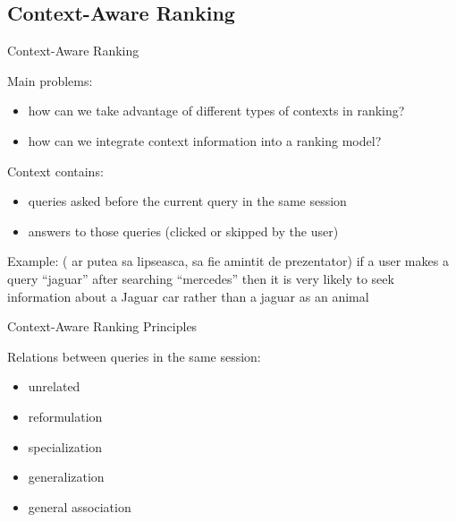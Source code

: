 \subsection{Context-Aware Ranking}


\begin{frame}{Context-Aware Ranking}

Main problems:
\begin{itemize}
	\item how can we take advantage of different types of contexts in ranking?
	\item how can we integrate context information into a ranking model? \newline
\end{itemize}

Context contains:
\begin{itemize}
	\item queries asked before the current query in the same session
	\item answers to those queries (clicked or skipped by the user) \newline
\end{itemize}

Example: ({\color{red} ar putea sa lipseasca, sa fie amintit de prezentator}) \newline
	if a user makes a query “jaguar” after searching “mercedes” then it is very likely to seek information about a Jaguar car rather than a jaguar as an animal

\end{frame}


\begin{frame}{Context-Aware Ranking Principles}

Relations between queries in the same session:
\begin{itemize}
	\item unrelated
	\item reformulation
	\item specialization
	\item generalization
	\item general association
\end{itemize}

\end{frame}


